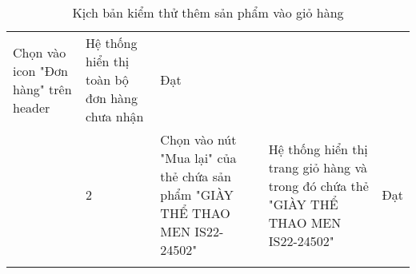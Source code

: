 {\begin{longtable}{| p{2.5cm}| p{1cm}| p{5.5cm}| p{4.5cm} | p{1.5cm} |}
        Chọn vào icon "Đơn hàng" trên header                                                         &
        Hệ thống hiển thị toàn bộ đơn hàng chưa nhận                                                 &
        Đạt                                                                                                                                                                                         \\
        \cline{2-5}
                                                                                                     & 2                  &
        Chọn vào nút "Mua lại" của thẻ chứa sản phẩm "GIÀY THỂ THAO MEN IS22-24502"                  &
        Hệ thống hiển thị trang giỏ hàng và trong đó chứa thẻ "GIÀY THỂ THAO MEN IS22-24502"         &
        Đạt                                                                                                                                                                                         \\
        \hline
        \caption{Kịch bản kiểm thử thêm sản phẩm vào giỏ hàng}
    \end{longtable}
}

